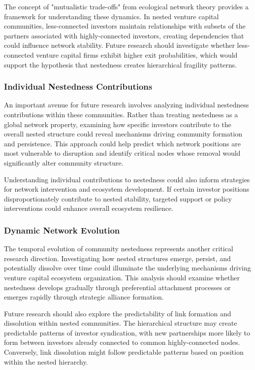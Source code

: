 The concept of "mutualistic trade-offs" from ecological network theory provides a framework for understanding these dynamics. In nested venture capital communities, less-connected investors maintain relationships with subsets of the partners associated with highly-connected investors, creating dependencies that could influence network stability. Future research should investigate whether less-connected venture capital firms exhibit higher exit probabilities, which would support the hypothesis that nestedness creates hierarchical fragility patterns.

\subsubsection{Individual Nestedness Contributions}

An important avenue for future research involves analyzing individual nestedness contributions within these communities. Rather than treating nestedness as a global network property, examining how specific investors contribute to the overall nested structure could reveal mechanisms driving community formation and persistence. This approach could help predict which network positions are most vulnerable to disruption and identify critical nodes whose removal would significantly alter community structure.

Understanding individual contributions to nestedness could also inform strategies for network intervention and ecosystem development. If certain investor positions disproportionately contribute to nested stability, targeted support or policy interventions could enhance overall ecosystem resilience.

\subsubsection{Dynamic Network Evolution}


The temporal evolution of community nestedness represents another critical research direction. Investigating how nested structures emerge, persist, and potentially dissolve over time could illuminate the underlying mechanisms driving venture capital ecosystem organization. This analysis should examine whether nestedness develops gradually through preferential attachment processes or emerges rapidly through strategic alliance formation.

Future research should also explore the predictability of link formation and dissolution within nested communities. The hierarchical structure may create predictable patterns of investor syndication, with new partnerships more likely to form between investors already connected to common highly-connected nodes. Conversely, link dissolution might follow predictable patterns based on position within the nested hierarchy.

